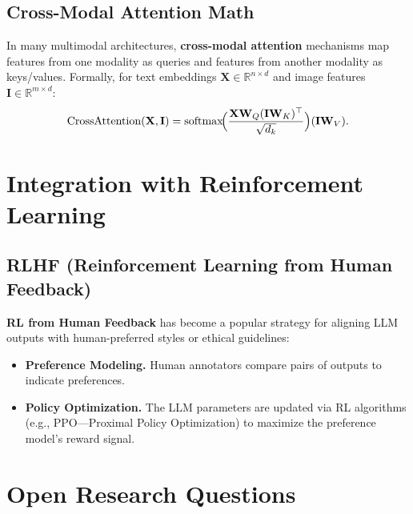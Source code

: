 \subsection{Cross-Modal Attention Math}
\noindent
In many multimodal architectures, \textbf{cross-modal attention} mechanisms map features from one modality as queries and features from another modality as keys/values. Formally, for text embeddings \(\mathbf{X} \in \mathbb{R}^{n \times d}\) and image features \(\mathbf{I} \in \mathbb{R}^{m \times d}\):
\[
\text{CrossAttention}(\mathbf{X}, \mathbf{I}) = \text{softmax}\!\Bigl(\frac{\mathbf{X} \mathbf{W}_Q(\mathbf{I} \mathbf{W}_K)^\top}{\sqrt{d_k}}\Bigr)(\mathbf{I} \mathbf{W}_V).
\]

\section{Integration with Reinforcement Learning}
\label{sec:rl_integration}

\subsection{RLHF (Reinforcement Learning from Human Feedback)}
\noindent
\textbf{RL from Human Feedback} has become a popular strategy for aligning LLM outputs with human-preferred styles or ethical guidelines:
\begin{itemize}
    \item \textbf{Preference Modeling.} Human annotators compare pairs of outputs to indicate preferences.
    \item \textbf{Policy Optimization.} The LLM parameters are updated via RL algorithms (e.g., PPO—Proximal Policy Optimization) to maximize the preference model's reward signal.
\end{itemize}

\section{Open Research Questions}
\label{sec:open_questions}

